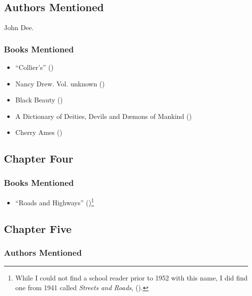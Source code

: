 \documentclass[
]{article}
\providecommand{\tightlist}{%
  \setlength{\itemsep}{0pt}\setlength{\parskip}{0pt}}
\begin{document}
\subsection{Authors Mentioned}\label{authors-mentioned-2}

John Dee.

\subsubsection{Books Mentioned}\label{books-mentioned-1}

\begin{itemize}
\tightlist
\item
  {``Collier's''} ()
\item
  Nancy Drew. Vol. unknown ()
\item
  Black Beauty ()
\item
  A Dictionary of Deities, Devils and Dæmons of Mankind
  ()
\item
  Cherry Ames ()
\end{itemize}

\subsection{Chapter Four}\label{chapter-four}

\subsubsection{Books Mentioned}\label{books-mentioned-2}

\begin{itemize}
\tightlist
\item
  {``Roads and Highways''} ()\footnote{While
    I could not find a school reader prior to 1952 with this name, I did
    find one from 1941 called \emph{Streets and Roads},
    ().}
\end{itemize}

\subsection{Chapter Five}\label{chapter-five}

\subsubsection{Authors Mentioned}\label{authors-mentioned-3}
\end{document}
